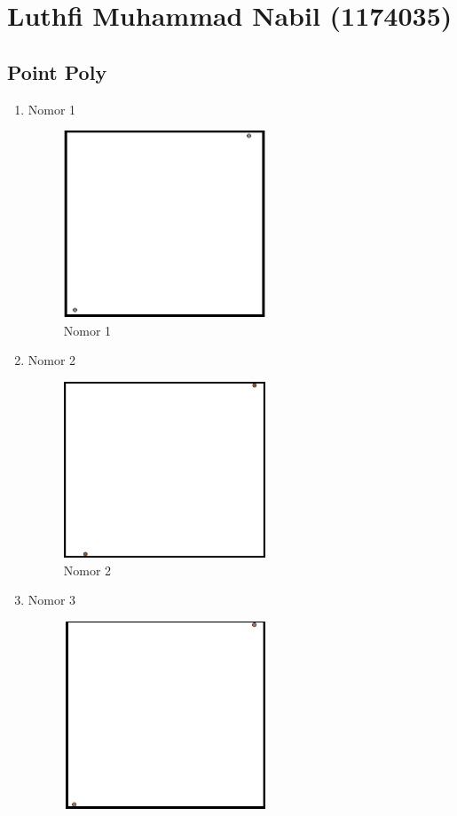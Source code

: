 \section{Luthfi Muhammad Nabil (1174035)}
\subsection{Point Poly}
\begin{enumerate}
    \item Nomor 1
    
    \begin{figure}[H]
		\includegraphics[width=6cm]{figures/1174035/tugas2/soal_1.png}
		\centering
		\caption{Nomor 1}
	\end{figure}
    \item Nomor 2
    
    \begin{figure}[H]
		\includegraphics[width=6cm]{figures/1174035/tugas2/soal_2.png}
		\centering
		\caption{Nomor 2}
	\end{figure}
    \item Nomor 3
    
    \begin{figure}[H]
		\includegraphics[width=6cm]{figures/1174035/tugas2/soal_3.png}

\end{figure}
\end{enumerate}
